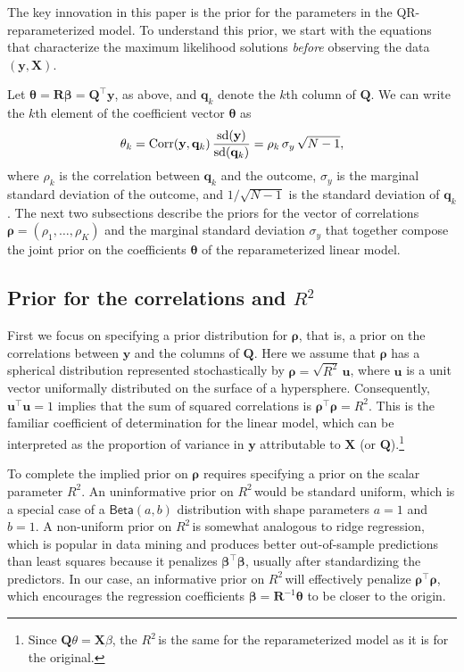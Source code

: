 \documentclass[11pt]{article}
\newcommand{\Rsq}{$R^2\,$}
\newcommand{\boldrho}{\boldsymbol{\rho}}
\newcommand{\boldbeta}{\boldsymbol{\beta}}
\newcommand{\boldtheta}{\boldsymbol{\theta}}
\newcommand{\X}{\mathbf{X}}
\newcommand{\y}{\mathbf{y}}
\newcommand{\Q}{\mathbf{Q}}
\newcommand{\R}{\mathbf{R}}
\renewcommand{\u}{\mathbf{u}}
\newcommand{\Betadist}[2]{\mathsf{Beta}\left(#1,#2\right)}
\begin{document}
The key innovation in this paper is the prior for the parameters in the
QR-reparameterized model. To understand this prior, we start with the equations
that characterize the maximum likelihood solutions \emph{before} observing the
data $\left(\y, \X\right)$.

Let $\boldtheta = \R\boldbeta = \Q^\top \y$, as above, and $\mathbf{q}_k$ denote
the $k$th column of $\Q$. We can write the $k$th element of the coefficient
vector $\boldtheta$ as
%
$$\theta_k
  = {\rm Corr}(\y, \mathbf{q}_k) \, \frac{{\rm sd}(\y)}{{\rm sd}(\mathbf{q}_k)}
  = \rho_k \, \sigma_y \, \sqrt{N - 1},
$$
%
where $\rho_k$ is the correlation between $\mathbf{q}_k$ and the outcome,
$\sigma_y$ is the marginal standard deviation of the outcome, and $1/\sqrt{N-1}$
is the standard deviation of $\mathbf{q}_k$. The next two subsections describe
the priors for the vector of correlations $\boldrho = (\rho_1, \dots, \rho_K)$
and the marginal standard deviation $\sigma_y$ that together compose the joint
prior on the coefficients $\boldtheta$ of the reparameterized linear model.

\subsection{Prior for the correlations and \Rsq}
\label{subsec:priorR2}
First we focus on specifying a prior distribution for $\boldrho$, that is, a
prior on the correlations between $\y$ and the columns of $\Q$. Here we assume
that $\boldrho$ has a spherical distribution represented stochastically by
$\boldrho = \sqrt{R^2} \, \u$, where $\u$ is a unit vector uniformally
distributed on the surface of a hypersphere. Consequently, $\u^\top\u = 1$
implies that the sum of squared correlations is $\boldrho^\top \boldrho = R^2$.
This is the familiar coefficient of determination for the linear model, which
can be interpreted as the proportion of variance in $\y$ attributable to $\X$
(or $\Q$).\footnote{Since $\Q\theta = \X\beta$, the \Rsq is the same for the
reparameterized model as it is for the original.}

To complete the implied prior on $\boldrho$ requires specifying a prior on the
scalar parameter $R^2$. An uninformative prior on \Rsq would be standard
uniform, which is a special case of a $\Betadist{a}{b}$ distribution with shape
parameters $a = 1$ and $b = 1$. A non-uniform prior on \Rsq is somewhat
analogous to ridge regression, which is popular in data mining and produces
better out-of-sample predictions than least squares because it penalizes
$\boldbeta^\top \boldbeta$, usually after standardizing the predictors. In our
case, an informative prior on \Rsq will effectively penalize
$\boldrho^\top \boldrho$, which encourages the regression coefficients
$\boldbeta = \R^{-1} \boldtheta$ to be closer to the origin.
\end{document}
